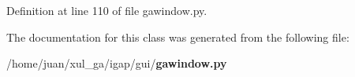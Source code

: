 \subsubsection{}\label{classgui_1_1gawindow_1_1GAWindow_164ddd75e2f5dd53dea2879eb2c2a69b}




Definition at line 110 of file gawindow.py.

The documentation for this class was generated from the following file:\begin{CompactItemize}
\item 
/home/juan/xul\_\-ga/igap/gui/{\bf gawindow.py}\end{CompactItemize}
